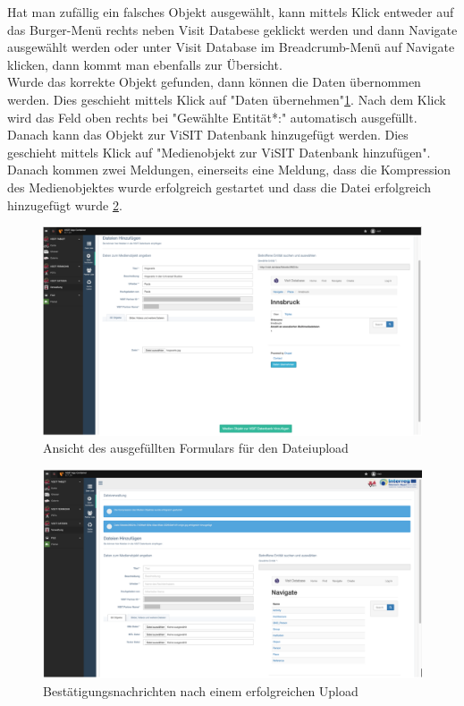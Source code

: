 Hat man zufällig ein falsches Objekt ausgewählt, kann mittels Klick entweder auf das Burger-Menü rechts neben Visit Databese geklickt werden und dann Navigate ausgewählt werden oder unter Visit Database im Breadcrumb-Menü auf Navigate klicken, dann kommt man ebenfalls zur Übersicht.\\

Wurde das korrekte Objekt gefunden, dann können die Daten übernommen werden. Dies geschieht mittels Klick auf "Daten übernehmen"\ref{img:datei_hochladen_ausgefuellt}. Nach dem Klick wird das Feld oben rechts bei "Gewählte Entität*:" automatisch ausgefüllt. Danach kann das Objekt zur ViSIT Datenbank hinzugefügt werden. Dies geschieht mittels Klick auf "Medienobjekt zur ViSIT Datenbank hinzufügen". Danach kommen zwei Meldungen, einerseits eine Meldung, dass die Kompression des Medienobjektes wurde erfolgreich gestartet und dass die Datei erfolgreich hinzugefügt wurde \ref{img:bestaetigung_nach_hochladen}.

\begin{figure}[ht!]
\centering
\includegraphics[width=12cm]{Figures/paula/dateiverwaltung/datei_hochladen_ausgefuellt.png}
\caption{Ansicht des ausgefüllten Formulars für den Dateiupload}
\label{img:datei_hochladen_ausgefuellt}
\end{figure}

\begin{figure}[ht!]
\centering
\includegraphics[width=12cm]{Figures/paula/dateiverwaltung/bestaetigung_nach_hochladen.png}
\caption{Bestätigungsnachrichten nach einem erfolgreichen Upload}
\label{img:bestaetigung_nach_hochladen}
\end{figure}

